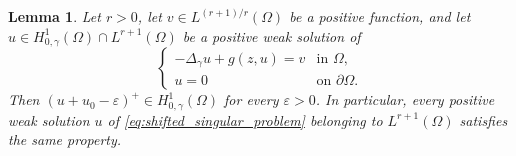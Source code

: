 \documentclass[11pt]{article}
\newtheorem{lemma}{Lemma}[section] %
\newcommand{\Gr}{\Delta_{\gamma}}
\newcommand{\spacegr}{H^{1}_{0,\gamma}(\Omega)}
\begin{document}



\begin{lemma}\label{lem:truncation-property}
Let $r>0$, let $v\in L^{(r+1)/r}(\Omega)$ be a positive function, and let $u\in \spacegr\cap L^{r+1}(\Omega)$ be a positive weak solution of
\begin{equation*}
\begin{cases}
-\Gr u + g(z,u) = v & \text{in } \Omega,\\
u = 0 & \text{on } \partial\Omega .
\end{cases}
\end{equation*}
Then $(u+u_{0}-\varepsilon)^+ \in \spacegr$ for every $\varepsilon>0$. In particular, every positive weak solution $u$ of \eqref{eq:shifted_singular_problem} belonging to $L^{r+1}(\Omega)$ satisfies the same property.
\end{lemma}
\end{document}
